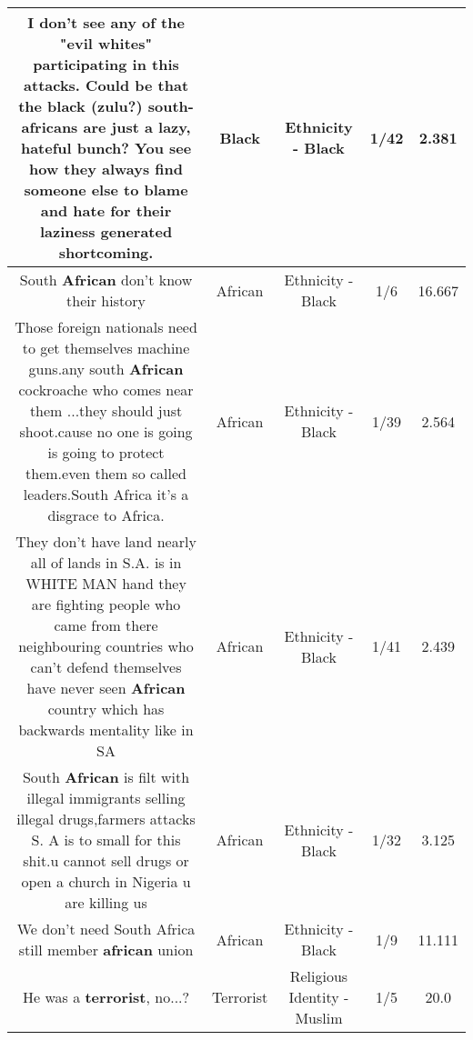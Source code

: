 \documentclass[11pt]{article}
\newlength\mylength
\begin{document}
\begin{center}
\begin{longtable}{|C{.65\mylength}|C{.30\mylength}|C{.12\mylength}|C{.12\mylength}|C{.12\mylength}|}
  \small I don't see any of the "evil whites" participating in this attacks. Could be that the \textbf{black} (zulu?) south-africans are just a lazy, hateful bunch? You see how they always find someone else to blame and hate for their laziness generated shortcoming.\normalsize   & Black & Ethnicity - Black & 1/42 & 2.381 \\  \hline
  \small South \textbf{African} don't know their history\normalsize   & African & Ethnicity - Black & 1/6 & 16.667 \\  \hline
  \small Those foreign nationals need to get themselves machine guns.any south \textbf{African} cockroache who comes near them ...they should just shoot.cause no one is going is going to protect them.even them so called leaders.South Africa it's a disgrace to Africa.\normalsize   & African & Ethnicity - Black & 1/39 & 2.564 \\  \hline
  \small They don't have land nearly all of lands in S.A. is in WHITE MAN hand they are fighting people who came  from there neighbouring countries who can't  defend themselves have never seen \textbf{African} country which has backwards mentality like in SA\normalsize   & African & Ethnicity - Black & 1/41 & 2.439 \\  \hline
  \small South \textbf{African} is filt with illegal immigrants selling illegal drugs,farmers attacks S. A is to small for this shit.u cannot sell drugs or open a church in Nigeria u are killing us\normalsize   & African & Ethnicity - Black & 1/32 & 3.125 \\  \hline
  \small We don't need South Africa still member \textbf{african} union\normalsize   & African & Ethnicity - Black & 1/9 & 11.111 \\  \hline
  \small He was a \textbf{terrorist}, no...?\normalsize   & Terrorist & Religious Identity - Muslim & 1/5 & 20.0 \\  \hline

\end{longtable}
\end{center}
\end{document}

